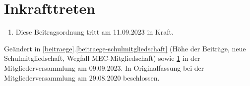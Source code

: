 \documentclass[a4paper, 12pt]{scrartcl}
\begin{document}
\section{Inkrafttreten}\label{inkrafttreten}
\begin{enumerate}
	\item Diese Beitragsordnung tritt am 11.09.2023 in Kraft.
\end{enumerate}


\vspace{2.5cm}

\noindent Geändert in \ref{beitraege}.\ref{beitraege-schulmitgliedschaft} (Höhe der Beiträge, neue Schulmitgliedschaft, Wegfall MEC-Mitgliedschaft) sowie \ref{inkrafttreten} in der Mitgliederversammlung am 09.09.2023. In Originalfassung bei der Mitgliederversammlung am 29.08.2020 beschlossen.

\end{document}
